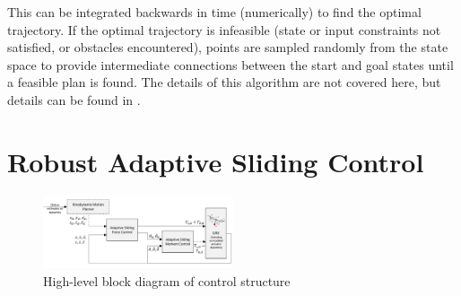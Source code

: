 \documentclass[letterpaper, 10 pt, conference]{ieeeconf}\usepackage[margin=1in]{geometry}
\begin{document}
This can be integrated backwards in time (numerically) to find the optimal trajectory. If the optimal trajectory is infeasible (state or input constraints not satisfied, or obstacles encountered), points are sampled randomly from the state space to provide intermediate connections between the start and goal states until a feasible plan is found. The details of this algorithm are not covered here, but details can be found in \cite{webb2013kinodynamic}.

\section{Robust Adaptive Sliding Control}
\begin{figure}
	\centering
	\includegraphics[width=0.5\textwidth]{block_diagram}
	\caption{High-level block diagram of control structure}
	\label{block}
\end{figure}
\end{document}
